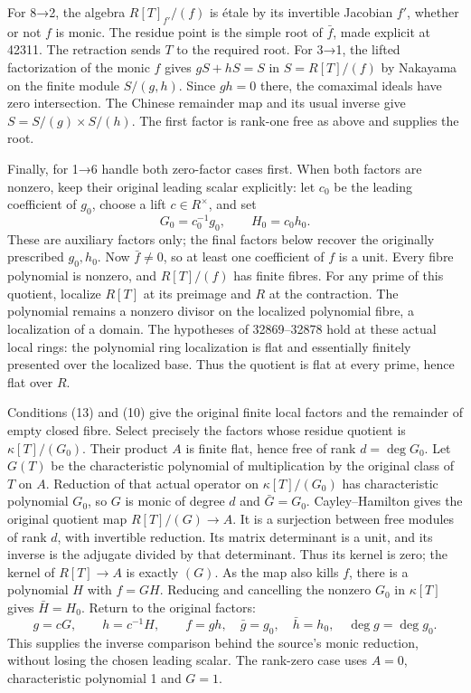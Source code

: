 For 8→2, the algebra \(R[T]_{f'}/(f)\) is étale by its invertible Jacobian \(f'\), whether or not \(f\) is monic. The residue point is the simple root of \(\bar f\), made explicit at 42311. The retraction sends \(T\) to the required root. For 3→1, the lifted factorization of the monic \(f\) gives \(gS+hS=S\) in \(S=R[T]/(f)\) by Nakayama on the finite module \(S/(g,h)\). Since \(gh=0\) there, the comaximal ideals have zero intersection. The Chinese remainder map and its usual inverse give \(S=S/(g)\times S/(h)\). The first factor is rank-one free as above and supplies the root.

Finally, for 1→6 handle both zero-factor cases first. When both factors are nonzero, keep their original leading scalar explicitly: let \(c_0\) be the leading coefficient of \(g_0\), choose a lift \(c\in R^\times\), and set \[
G_0=c_0^{-1}g_0,\qquad H_0=c_0h_0.
\] These are auxiliary factors only; the final factors below recover the originally prescribed \(g_0,h_0\). Now \(\bar f\ne0\), so at least one coefficient of \(f\) is a unit. Every fibre polynomial is nonzero, and \(R[T]/(f)\) has finite fibres. For any prime of this quotient, localize \(R[T]\) at its preimage and \(R\) at the contraction. The polynomial remains a nonzero divisor on the localized polynomial fibre, a localization of a domain. The hypotheses of 32869--32878 hold at these actual local rings: the polynomial ring localization is flat and essentially finitely presented over the localized base. Thus the quotient is flat at every prime, hence flat over \(R\).

Conditions (13) and (10) give the original finite local factors and the remainder of empty closed fibre. Select precisely the factors whose residue quotient is \(\kappa[T]/(G_0)\). Their product \(A\) is finite flat, hence free of rank \(d=\deg G_0\). Let \(G(T)\) be the characteristic polynomial of multiplication by the original class of \(T\) on \(A\). Reduction of that actual operator on \(\kappa[T]/(G_0)\) has characteristic polynomial \(G_0\), so \(G\) is monic of degree \(d\) and \(\bar G=G_0\). Cayley--Hamilton gives the original quotient map \(R[T]/(G)\to A\). It is a surjection between free modules of rank \(d\), with invertible reduction. Its matrix determinant is a unit, and its inverse is the adjugate divided by that determinant. Thus its kernel is zero; the kernel of \(R[T]\to A\) is exactly \((G)\). As the map also kills \(f\), there is a polynomial \(H\) with \(f=GH\). Reducing and cancelling the nonzero \(G_0\) in \(\kappa[T]\) gives \(\bar H=H_0\). Return to the original factors: \[
g=cG,\qquad h=c^{-1}H,\qquad
f=gh,\quad\bar g=g_0,\quad\bar h=h_0,\quad\deg g=\deg g_0.
\] This supplies the inverse comparison behind the source's monic reduction, without losing the chosen leading scalar. The rank-zero case uses \(A=0\), characteristic polynomial 1 and \(G=1\).

